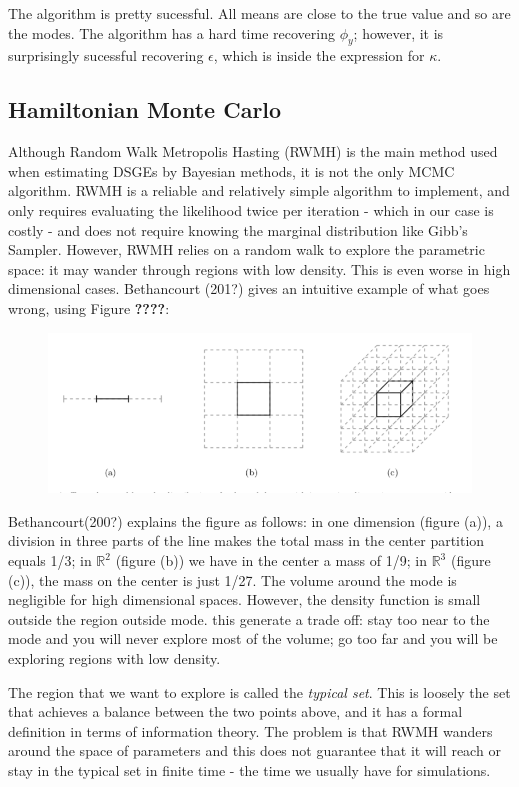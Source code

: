 \documentclass[12pt,a4paper]{article}
\begin{document}
The algorithm is pretty sucessful. All means are close to the true value and so are the modes. The algorithm has a hard time recovering $\phi_y$; however, it is surprisingly sucessful recovering $\epsilon$, which is inside the expression for $\kappa$.  

\subsection{Hamiltonian Monte Carlo}
Although Random Walk Metropolis Hasting (RWMH) is the main method used when estimating DSGEs by Bayesian methods, it is not the only MCMC algorithm. RWMH is a reliable and relatively simple algorithm to implement, and only requires evaluating the likelihood twice per iteration - which in our case is costly - and does not require knowing the marginal distribution like Gibb's Sampler. However, RWMH relies on a random walk to explore the parametric space: it may wander through regions with low density. This is even worse in high dimensional cases. Bethancourt (201?) gives an intuitive example of what goes wrong, using Figure \textbf{????}:

\begin{figure}
\centering
\includegraphics{../3regions.png}
\caption{}
\end{figure}


Bethancourt(200?) explains the figure as follows: in one dimension (figure (a)), a division in three parts of the line makes the total mass in the center partition equals 1/3; in $\mathbb{R}^2$ (figure (b)) we have in the center a mass of 1/9; in $\mathbb{R}^3$ (figure (c)), the mass on the center is just 1/27. The volume around the mode is negligible for high dimensional spaces. However, the density function is small outside the region outside mode. this generate a trade off: stay too near to the mode and you will never explore most of the volume; go too far and you will be exploring regions with low density.

The region that we want to explore is called the \emph{typical set}. This is loosely the set that achieves a balance between the two points above, and it has a formal definition in terms of information theory. The problem is that RWMH wanders around the space of parameters and this does not guarantee that it will reach or stay in the typical set in finite time - the time we usually have for simulations.
\end{document}
